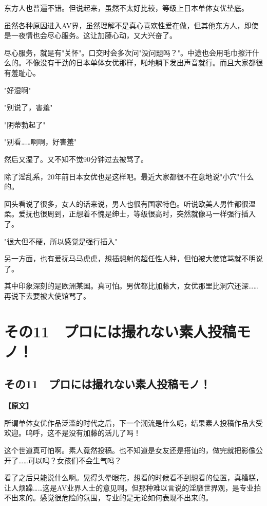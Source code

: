 \documentclass[12pt,UTF8]{ctexbook}
\begin{document}
{{东方人也普遍不错。但说起来，虽然不太好比较，等级上日本单体女优垫底。

虽然各种原因进入AV界，虽然理解不是真心喜欢性爱在做，但其他东方人，即使是一夜情也会尽心服务。这让加藤心动，又大兴奋了。

尽心服务，就是有"关怀"。口交时会多次问"没问题吗？"。中途也会用毛巾擦汗什么的。不像没有干劲的日本单体女优那样，啪地躺下发出声音就行。而且大家都很有羞耻心。

"好湿啊"

"别说了，害羞"

"阴蒂勃起了"

"别看……啊啊，好害羞"

然后又湿了。又不知不觉90分钟过去被骂了。

除了淫乱系，20年前日本女优也是这样吧。最近大家都很不在意地说"小穴"什么的。

回头看说了很多，女人的话来说，男人也很有国家特色。听说欧美人男性都很温柔。爱抚也很周到，正想着不愧是绅士，等级很高时，突然就像马一样强行插入了。

"很大但不硬，所以感觉是强行插入"

另一方面，也有爱抚马马虎虎，想插想射的超任性人种，但怕被大使馆骂就不明说了。

其中印象深刻的是欧洲某国。真可怕。男优都比加藤大，女优那里比洞穴还深……再说下去要被大使馆骂了。
}

\chapter{その11　プロには撮れない素人投稿モノ！}
\label{chap:11}

\section{その11　プロには撮れない素人投稿モノ！}

\vspace{1ex}
\parbox{0.9\linewidth}{
\textbf{【原文】}\par

所谓单体女优作品泛滥的时代之后，下一个潮流是什么呢，结果素人投稿作品大受欢迎。呜呼，这不是没有加藤的活儿了吗！

这个世道真可怕啊。素人竟然投稿。也不知道是女友还是搭讪的，做完就把影像公开了……可以吗？女孩们不会生气吗？

看了之后只能说什么啊。晃得头晕眼花，想看的时候看不到想看的位置，真糟糕，让人烦躁……这是AV业界人士的意见啊。但那种难以言说的淫靡世界观，是专业拍不出来的。感觉很危险的氛围，专业的是无论如何表现不出来的。

}}
\end{document}
